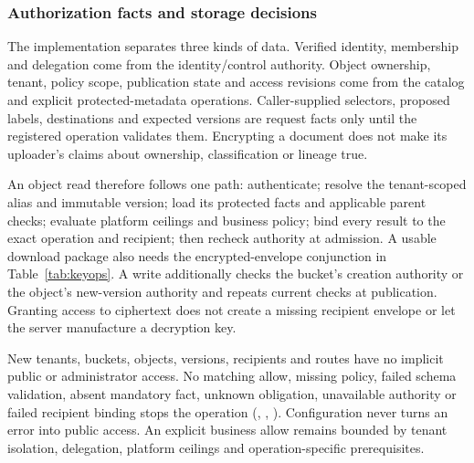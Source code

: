 
\subsubsection{Authorization facts and storage decisions}
The implementation separates three kinds of data. Verified identity, membership and delegation come from the identity/control authority. Object ownership, tenant, policy scope, publication state and access revisions come from the catalog and explicit protected-metadata operations. Caller-supplied selectors, proposed labels, destinations and expected versions are request facts only until the registered operation validates them. Encrypting a document does not make its uploader's claims about ownership, classification or lineage true.

An object read therefore follows one path: authenticate; resolve the tenant-scoped alias and immutable version; load its protected facts and applicable parent checks; evaluate platform ceilings and business policy; bind every result to the exact operation and recipient; then recheck authority at admission. A usable download package also needs the encrypted-envelope conjunction in Table~\ref{tab:keyops}. A write additionally checks the bucket's creation authority or the object's new-version authority and repeats current checks at publication. Granting access to ciphertext does not create a missing recipient envelope or let the server manufacture a decryption key.

New tenants, buckets, objects, versions, recipients and routes have no implicit public or administrator access. No matching allow, missing policy, failed schema validation, absent mandatory fact, unknown obligation, unavailable authority or failed recipient binding stops the operation (, , ). Configuration never turns an error into public access. An explicit business allow remains bounded by tenant isolation, delegation, platform ceilings and operation-specific prerequisites.

